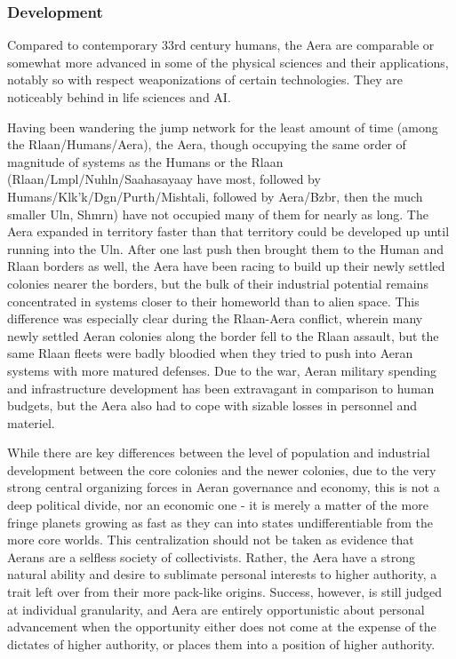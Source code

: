 \subsubsection{Development}
Compared to contemporary 33rd century humans, the Aera are comparable
or somewhat more advanced in some of the physical sciences and their
applications, notably so with respect weaponizations of certain
technologies. They are noticeably behind in life sciences and AI.

Having been wandering the jump network for the least amount of time
(among the Rlaan/Humans/Aera), the Aera, though occupying the same
order of magnitude of systems as the Humans or the Rlaan
(Rlaan/Lmpl/Nuhln/Saahasayaay have most, followed by
Humans/Klk'k/Dgn/Purth/Mishtali, followed by Aera/Bzbr, then the much
smaller Uln, Shmrn) have not occupied many of them for nearly as
long. The Aera expanded in territory faster than that territory could
be developed up until running into the Uln. After one last push then
brought them to the Human and Rlaan borders as well, the Aera have
been racing to build up their newly settled colonies nearer the
borders, but the bulk of their industrial potential remains
concentrated in systems closer to their homeworld than to alien
space. This difference was especially clear during the Rlaan-Aera
conflict, wherein many newly settled Aeran colonies along the border
fell to the Rlaan assault, but the same Rlaan fleets were badly
bloodied when they tried to push into Aeran systems with more matured
defenses. Due to the war, Aeran military spending and infrastructure
development has been extravagant in comparison to human budgets, but
the Aera also had to cope with sizable losses in personnel and
materiel.

While there are key differences between the level of population and
industrial development between the core colonies and the newer
colonies, due to the very strong central organizing forces in Aeran
governance and economy, this is not a deep political divide, nor an
economic one - it is merely a matter of the more fringe planets
growing as fast as they can into states undifferentiable from the more
core worlds. This centralization should not be taken as evidence that
Aerans are a selfless society of collectivists. Rather, the Aera have
a strong natural ability and desire to sublimate personal interests to
higher authority, a trait left over from their more pack-like
origins. Success, however, is still judged at individual granularity,
and Aera are entirely opportunistic about personal advancement when
the opportunity either does not come at the expense of the dictates of
higher authority, or places them into a position of higher authority.

